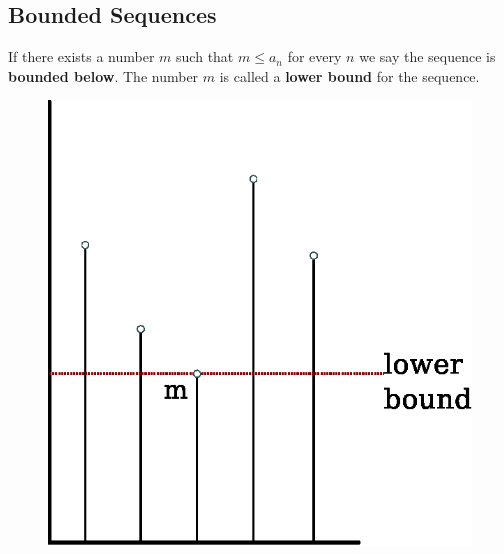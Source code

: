 \subsection{Bounded Sequences}
\begin{defn}
  If there exists a number $m$ such that $m \leq a_n$ for every $n$ we say the sequence is \textbf{bounded below}.
  The number $m$ is called a \textbf{lower bound} for the sequence.
  \begin{figure}[h]
    \begin{center}
      \includegraphics[scale=0.5]{continuous/sequence/lwrbnd.eps}
    \end{center}
  \end{figure}
\end{defn}
